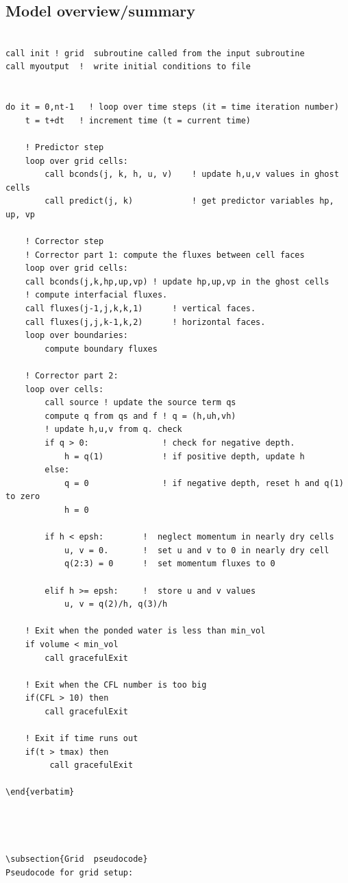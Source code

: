 \documentclass{article}
\begin{document}
\subsection{ Model overview/summary}

\begin{lstlisting}
 
call init ! grid  subroutine called from the input subroutine
call myoutput  !  write initial conditions to file


do it = 0,nt-1   ! loop over time steps (it = time iteration number)
	t = t+dt   ! increment time (t = current time)

	! Predictor step
	loop over grid cells: 
		call bconds(j, k, h, u, v)    ! update h,u,v values in ghost cells
		call predict(j, k)            ! get predictor variables hp, up, vp

    ! Corrector step
	! Corrector part 1: compute the fluxes between cell faces
	loop over grid cells: 			  
    call bconds(j,k,hp,up,vp) ! update hp,up,vp in the ghost cells
    ! compute interfacial fluxes. 
    call fluxes(j-1,j,k,k,1)      ! vertical faces. 
    call fluxes(j,j,k-1,k,2)      ! horizontal faces.
	loop over boundaries:
		compute boundary fluxes
	
	! Corrector part 2: 
	loop over cells:
		call source ! update the source term qs
		compute q from qs and f	! q = (h,uh,vh)
		! update h,u,v from q. check 
	    if q > 0:				! check for negative depth.	
			h = q(1) 		    ! if positive depth, update h
	    else:
			q = 0 				! if negative depth, reset h and q(1) to zero
			h = 0					  
	
	    if h < epsh: 		!  neglect momentum in nearly dry cells
			u, v = 0.		!  set u and v to 0 in nearly dry cell	  
			q(2:3) = 0 		!  set momentum fluxes to 0
	    
	    elif h >= epsh:		!  store u and v values
	    	u, v = q(2)/h, q(3)/h
		    
    ! Exit when the ponded water is less than min_vol    
    if volume < min_vol
    	call gracefulExit
    	
    ! Exit when the CFL number is too big
    if(CFL > 10) then
        call gracefulExit
        
	! Exit if time runs out
    if(t > tmax) then
         call gracefulExit
            
\end{verbatim}




\subsection{Grid  pseudocode}
Pseudocode for grid setup: 


\end{lstlisting}
\end{document}
